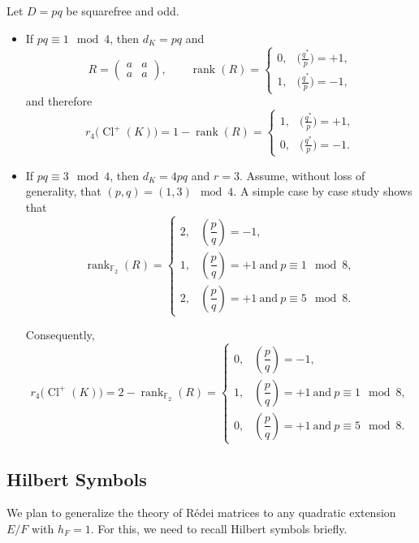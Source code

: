 \documentclass{article}
\numberwithin{equation}{section}
\theoremstyle{plain}  %
\theoremstyle{definition}
\newcommand{\F}{\mathbb{F}}
\newcommand{\Redei}{R\'edei }
\DeclareMathOperator{\rank}{rank}
\DeclareMathOperator{\Cl}{Cl}
\begin{document}
Let $D=pq$ be squarefree and odd.
\begin{itemize}
\item If $pq\equiv 1\mod 4$, then $d_K=pq$ and 
$$
R=\begin{pmatrix} a & a \\ a & a \end{pmatrix},
\qquad
\rank(R)=
\begin{cases}
0,& \bigl(\frac{q^*}{p}\bigr)=+1,\\
1,& \bigl(\frac{q^*}{p}\bigr)=-1,
\end{cases}
$$
and therefore
\begin{equation} \label{eq: rk4 for 1 mod 4}
r_4\!\bigl(\Cl^+(K)\bigr)=1-\rank(R)=
\begin{cases}
1,& \bigl(\frac{q^*}{p}\bigr)=+1,\\
0,& \bigl(\frac{q^*}{p}\bigr)=-1.
\end{cases}
\end{equation}

\item If $pq\equiv 3\mod 4$, then $d_K=4pq$ and $r=3$. Assume, without loss of generality, that $(p,q)=(1,3) \mod 4$.
A simple case by case study shows that $$
\rank_{\F_2}(R)=
\begin{cases}
2, & \left(\dfrac{p}{q}\right)=-1,\\
1, & \left(\dfrac{p}{q}\right)=+1 \ \text{and}\ p\equiv 1\mod 8, \\
2, & \left(\dfrac{p}{q}\right)=+1 \ \text{and}\ p\equiv 5\mod 8.
\end{cases}
$$

Consequently,
\begin{equation} \label{eq: rk4 for 3 mod 4}
r_4 \bigl(\Cl^+(K)\bigr)= 2-\rank_{\F_2}(R)=
\begin{cases}
0, & \left(\dfrac{p}{q}\right)=-1,\\
1, & \left(\dfrac{p}{q}\right)=+1 \ \text{and}\ p\equiv 1\mod 8, \\
0, & \left(\dfrac{p}{q}\right)=+1 \ \text{and}\ p\equiv 5\mod 8.
\end{cases}
\end{equation}

\end{itemize}




\subsection{Hilbert Symbols}
We plan to generalize the theory of \Redei matrices to any quadratic extension $E/F$ with $h_F=1$. For this, we need to recall Hilbert symbols briefly.
\end{document}
